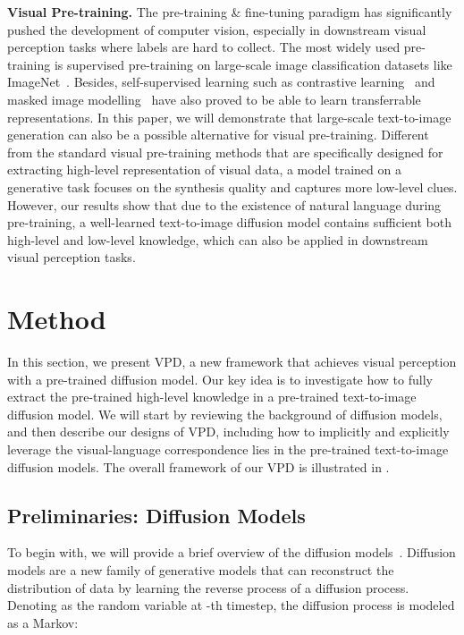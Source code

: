 \documentclass[10pt,twocolumn,letterpaper]{article}
\newcommand{\paragrapha}[2][4pt]{\vspace{#1}\noindent\textbf{#2}}
\begin{document}
\paragrapha{Visual Pre-training.} The pre-training \& fine-tuning paradigm has significantly pushed the development of computer vision, especially in downstream visual perception tasks where labels are hard to collect. The most widely used pre-training is supervised pre-training on large-scale image classification datasets like ImageNet~\cite{deng2009imagenet}. Besides, self-supervised learning such as contrastive learning~\cite{caron2021dino,he2019moco} and masked image modelling~\cite{peng2022beitv2,he2022mae} have also proved to be able to learn transferrable representations. In this paper, we will demonstrate that large-scale text-to-image generation can also be a possible alternative for visual pre-training. Different from the standard visual pre-training methods that are specifically designed for extracting high-level representation of visual data, a model trained on a generative task focuses on the synthesis quality and captures more low-level clues. However, our results show that due to the existence of natural language during pre-training, a well-learned text-to-image diffusion model contains sufficient both high-level and low-level knowledge, which can also be applied in downstream visual perception tasks.






\section{Method}\label{sec:method}
In this section, we present VPD, a new framework that achieves visual perception with a pre-trained diffusion model. Our key idea is to investigate how to fully extract the pre-trained high-level knowledge in a pre-trained text-to-image diffusion model. We will start by reviewing the background of diffusion models, and then describe our designs of VPD, including how to implicitly and explicitly leverage the visual-language correspondence lies in the pre-trained text-to-image diffusion models. The overall framework of our VPD is illustrated in .

\subsection{Preliminaries: Diffusion Models}

To begin with, we will provide a brief overview of the diffusion models~\cite{sohl2015deep, ho2020ddpm, kingma2021variational}. Diffusion models are a new family of generative models that can reconstruct the distribution of data by learning the reverse process of a diffusion process. Denoting  as the random variable at -th timestep, the diffusion process is modeled as a Markov: 
\end{document}
